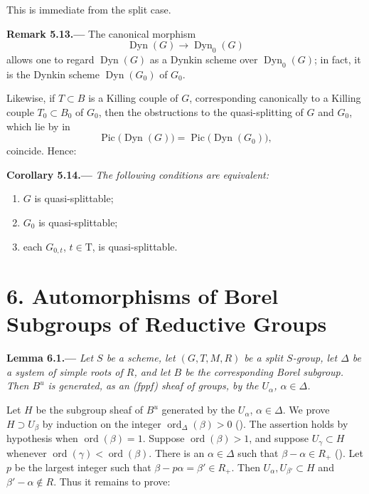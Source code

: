 This is immediate from the split case.

\par\medskip\noindent{}\textbf{Remark 5.13.---}\enspace
The canonical morphism
\[
  \operatorname{Dyn}(G)\longrightarrow\operatorname{Dyn}_0(G)
\]
allows one to regard \(\operatorname{Dyn}(G)\) as a Dynkin scheme over
\(\operatorname{Dyn}_0(G)\); in fact, it is the Dynkin scheme
\(\operatorname{Dyn}(G_0)\) of \(G_0\).

Likewise, if \(T\subset B\) is a Killing couple of \(G\), corresponding
canonically to a Killing couple \(T_0\subset B_0\) of \(G_0\), then the
obstructions to the quasi-splitting of \(G\) and \(G_0\), which lie by
 in
\[
  \operatorname{Pic}\bigl(\operatorname{Dyn}(G)\bigr)
  =
  \operatorname{Pic}\bigl(\operatorname{Dyn}(G_0)\bigr),
\]
coincide.  Hence:

\par\medskip\noindent{}\textbf{Corollary 5.14.---}\enspace
\emph{The following conditions are equivalent:}
\begin{enumerate}
\item[(i)] \(G\) is quasi-splittable;
\item[(ii)] \(G_0\) is quasi-splittable;
\item[(iii)] each \(G_{0,t}\), \(t\in\mathrm T\), is quasi-splittable.
\end{enumerate}

\section*{6. Automorphisms of Borel Subgroups of Reductive Groups}

\par\medskip\noindent{}\textbf{Lemma 6.1.---}\enspace
\emph{Let \(S\) be a scheme, let \((G,T,M,R)\) be a split \(S\)-group,
let \(\Delta\) be a system of simple roots of \(R\), and let \(B\) be
the corresponding Borel subgroup.  Then \(B^u\) is generated, as an
\textup{(fppf)} sheaf of groups, by the \(U_\alpha\),
\(\alpha\in\Delta\).}

Let \(H\) be the subgroup sheaf of \(B^u\) generated by the
\(U_\alpha\), \(\alpha\in\Delta\).  We prove
\(H\supset U_\beta\) by induction on the integer
\(\operatorname{ord}_\Delta(\beta)>0\)
().  The assertion holds by hypothesis when
\(\operatorname{ord}(\beta)=1\).  Suppose
\(\operatorname{ord}(\beta)>1\), and suppose
\(U_\gamma\subset H\) whenever
\(\operatorname{ord}(\gamma)<\operatorname{ord}(\beta)\).  There is an
\(\alpha\in\Delta\) such that \(\beta-\alpha\in R_+\)
().  Let \(p\) be the largest integer such that
\(\beta-p\alpha=\beta'\in R_+\).  Then
\(U_\alpha,U_{\beta'}\subset H\) and \(\beta'-\alpha\notin R\).
Thus it remains to prove:

